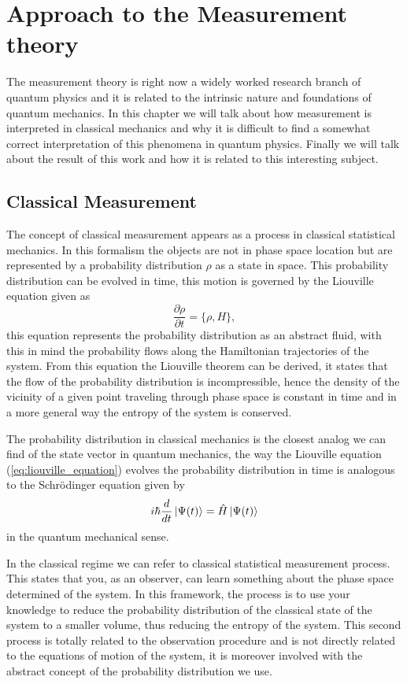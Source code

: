 \chapter{Approach to the Measurement theory}
The measurement theory is right now a widely worked research branch of quantum physics and it is related to the intrinsic nature and foundations of quantum mechanics. In this chapter we will talk about how measurement is interpreted in classical mechanics and why it is difficult to find a somewhat correct interpretation of this phenomena in quantum physics. Finally we will talk about the result of this work and how it is related to this interesting subject.
\section{Classical Measurement}
The concept of classical measurement appears as a process in classical statistical mechanics. In this formalism the objects are not in phase space location but are represented by a probability distribution $\rho$ as a state in space.  This probability distribution can be evolved in time, this motion is governed by the Liouville equation given as 
\begin{equation}
	\frac{\partial \rho}{\partial t}=\{ \rho,H\},
	\label{eq:liouville_equation}
\end{equation}
this equation represents the probability distribution as an abstract fluid, with this in mind the probability flows along the Hamiltonian trajectories of the system. From this equation the Liouville theorem can be derived, it states that the flow of the probability distribution is incompressible, hence the density of the vicinity of a given point traveling through phase space is constant in time and in a more general way the entropy of the system is conserved.\par

The probability distribution in classical mechanics is the closest analog we can find of the state vector in quantum mechanics, the way the Liouville equation (\ref{eq:liouville_equation}) evolves the probability distribution in time is analogous to the Schrödinger equation given by
\begin{equation}
	i\hbar \frac{d }{dt}\ket{\Psi(t)}=\hat{H}\ket{\Psi(t)}
	\label{eq:schrodinger_equation}
\end{equation}
in the quantum mechanical sense. \par 
In the classical regime we can refer to classical statistical measurement process. This states that you, as an observer, can learn something about the phase space determined of the system. In this framework, the process is to use your knowledge to reduce the probability distribution of the classical state of the system to a smaller volume, thus reducing the entropy of the system. This second process is totally related to the observation procedure and is not directly related to the equations of motion of the system, it is moreover involved with the abstract concept of the probability distribution we use.\par

